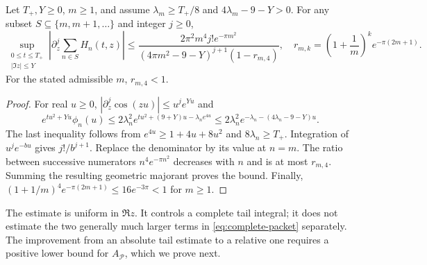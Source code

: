 \begin{lemma}\label{lem:strip-tail}
Let $T_+,Y\ge0$, $m\ge1$, and assume
$\lambda_m\ge T_+/8$ and $4\lambda_m-9-Y>0$. For any subset
$S\subseteq\{m,m+1,\ldots\}$ and integer $j\ge0$,
\begin{equation}\label{eq:strip-tail}
 \sup_{\substack{0\le t\le T_+\\|\Im z|\le Y}}
 \left|\partial_z^j\sum_{n\in S}H_n(t,z)\right|
 \le\frac{2\pi^2m^4 j!e^{-\pi m^2}}
 {(4\pi m^2-9-Y)^{j+1}(1-r_{m,4})},
 \quad r_{m,k}=\left(1+\frac1m\right)^k e^{-\pi(2m+1)}.
\end{equation}
For the stated admissible $m$, $r_{m,4}<1$.
\end{lemma}
\begin{proof}
For real $u\ge0$, $|\partial_z^j\cos(zu)|\le u^je^{Yu}$ and
\[
 e^{tu^2+Yu}\phi_n(u)
 \le2\lambda_n^2
 e^{tu^2+(9+Y)u-\lambda_ne^{4u}}
 \le2\lambda_n^2e^{-\lambda_n-(4\lambda_n-9-Y)u}.
\]
The last inequality follows from $e^{4u}\ge1+4u+8u^2$ and
$8\lambda_n\ge T_+$. Integration of $u^je^{-bu}$ gives $j!/b^{j+1}$.
Replace the denominator by its value at $n=m$. The ratio between successive
numerators $n^4e^{-\pi n^2}$ decreases with $n$ and is at most $r_{m,4}$.
Summing the resulting geometric majorant proves the bound. Finally,
$(1+1/m)^4e^{-\pi(2m+1)}\le16e^{-3\pi}<1$ for $m\ge1$.
\end{proof}

The estimate is uniform in $\Re z$. It controls a complete tail integral;
it does not estimate the two generally much larger terms in
\eqref{eq:complete-packet} separately. The improvement from an absolute
tail estimate to a relative one requires a positive lower bound for
$A_{\mathcal P}$, which we prove next.
